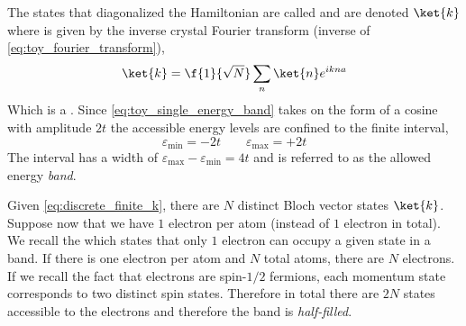 \documentclass{article}
\begin{document}
The states that diagonalized the Hamiltonian are called  and are denoted $\ket{k}$ where is given by the inverse crystal Fourier transform (inverse of \cref{eq:toy_fourier_transform}),
\[ \ket{k} = \f{1}{\sqrt{N}} \sum_{n} \ket{n} e^{i k na} \]
Which is a . Since \cref{eq:toy_single_energy_band} takes on the form of a cosine with amplitude $2t$ the accessible energy levels are confined to the finite interval,
\[ \varepsilon_{\min} = - 2t \qquad \varepsilon_{\max} = + 2t \]
The interval has a width of $\varepsilon_{\max} - \varepsilon_{\min} = 4t$ and is referred to as the allowed energy \textit{band}.

\begin{center}
\end{center}

Given \cref{eq:discrete_finite_k}, there are $N$ distinct Bloch vector states $\ket{k}$. Suppose now that we have $1$ electron per atom (instead of $1$ electron in total). We recall the  which states that only $1$ electron can occupy a given state in a band. If there is one electron per atom and $N$ total atoms, there are $N$ electrons. If we recall the fact that electrons are spin-$1/2$ fermions, each momentum state corresponds to two distinct spin states. Therefore in total there are $2N$ states accessible to the electrons and therefore the band is \textit{half-filled}.
\begin{center}
\end{center}
\end{document}
